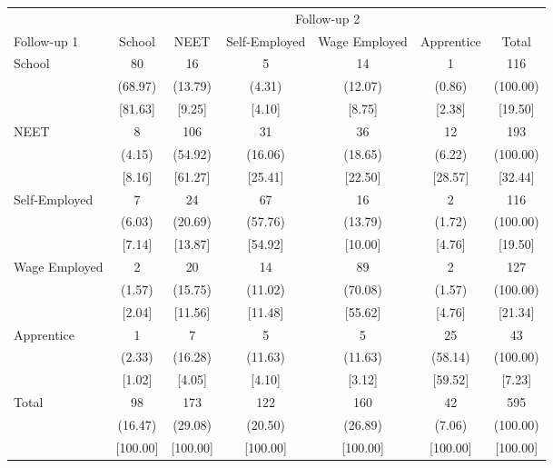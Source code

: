 {
\def\sym#1{\ifmmode^{#1}\else\(^{#1}\)\fi}
\begin{tabular}{l*{6}{c}}
\hline\hline
            &\multicolumn{6}{c}{Follow-up 2}                                              \\
Follow-up 1 &      School&        NEET&Self-Employed&Wage Employed&  Apprentice&       Total\\
\hline
School      &          80&          16&           5&          14&           1&         116\\
            &     (68.97)&     (13.79)&      (4.31)&     (12.07)&      (0.86)&    (100.00)\\
            &     [81.63]&      [9.25]&      [4.10]&      [8.75]&      [2.38]&     [19.50]\\
NEET        &           8&         106&          31&          36&          12&         193\\
            &      (4.15)&     (54.92)&     (16.06)&     (18.65)&      (6.22)&    (100.00)\\
            &      [8.16]&     [61.27]&     [25.41]&     [22.50]&     [28.57]&     [32.44]\\
Self-Employed&           7&          24&          67&          16&           2&         116\\
            &      (6.03)&     (20.69)&     (57.76)&     (13.79)&      (1.72)&    (100.00)\\
            &      [7.14]&     [13.87]&     [54.92]&     [10.00]&      [4.76]&     [19.50]\\
Wage Employed&           2&          20&          14&          89&           2&         127\\
            &      (1.57)&     (15.75)&     (11.02)&     (70.08)&      (1.57)&    (100.00)\\
            &      [2.04]&     [11.56]&     [11.48]&     [55.62]&      [4.76]&     [21.34]\\
Apprentice  &           1&           7&           5&           5&          25&          43\\
            &      (2.33)&     (16.28)&     (11.63)&     (11.63)&     (58.14)&    (100.00)\\
            &      [1.02]&      [4.05]&      [4.10]&      [3.12]&     [59.52]&      [7.23]\\
Total       &          98&         173&         122&         160&          42&         595\\
            &     (16.47)&     (29.08)&     (20.50)&     (26.89)&      (7.06)&    (100.00)\\
            &    [100.00]&    [100.00]&    [100.00]&    [100.00]&    [100.00]&    [100.00]\\
\hline\hline
\end{tabular}
}
